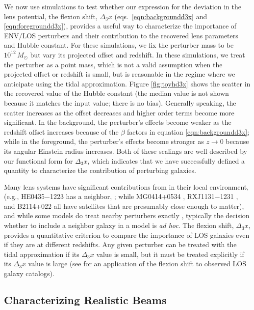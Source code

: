 \documentclass{emulateapj}
\begin{document}
We now use simulations to test whether our expression for the deviation in the lens potential, the flexion shift, $\Delta_3 x$ (eqs.\ \ref{eqn:backgroundd3x} and \ref{eqn:foregroundd3x}), provides a useful way to characterize the importance of ENV/LOS perturbers and their contribution to the recovered lens parameters and Hubble constant. For these simulations, we fix the perturber mass to be $10^{12}\,M_\odot$ but vary its projected offset and redshift. In these simulations, we treat the perturber as a point mass, which is not a valid assumption when the projected offset or redshift is small, but is reasonable in the regime where we anticipate using the tidal approximation.  Figure \ref{fig:toyhd3x} shows the scatter in the recovered value of the Hubble constant (the median value is not shown because it matches the input value; there is no bias).  Generally speaking, the scatter increases as the offset decreases and higher order terms become more significant. In the background, the perturber's effects become weaker as the redshift offset increases because of the $\beta$ factors in equation \ref{eqn:backgroundd3x}; while in the foreground, the perturber's effects become stronger as $z \to 0$ because its angular Einstein radius increases.  Both of these scalings are well described by our functional form for $\Delta_3 x$, which indicates that we have successfully defined a quantity to characterize the contribution of perturbing galaxies. 

Many lens systems have significant contributions from in their local environment, (e.g., HE0435$-$1223 has a neighbor, \citealt{Kochanek06}; while MG0414+0534 \citep{Tonry99}, RXJ1131$-$1231 \citep[hereafter RXJ1131][]{Sluse03}, and B2114+022 \citep{King99} all have satellites that are presumably close enough to matter), and while some models do treat nearby perturbers exactly \citep[e.g.,][]{Kochanek06, Fadely12}, typically the decision whether to include a neighbor galaxy in a model is \textit{ad hoc}. The flexion shift, $\Delta_3 x$, provides a quantitative criterion to compare the importance of LOS galaxies even if they are at different redshifts. Any given perturber can be treated with the tidal approximation if its $\Delta_3 x$ value is small, but it must be treated explicitly if its $\Delta_3 x$ value is large (see \citealt{Sluse16} for an application of the flexion shift to observed LOS galaxy catalogs).

\subsection{Characterizing Realistic Beams\label{sec:Environments}}
\end{document}
